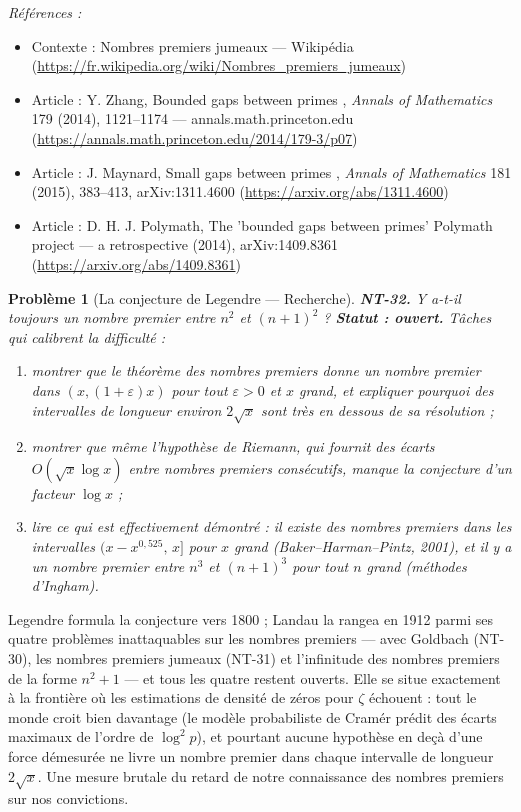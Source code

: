 \documentclass[11pt]{article}
\newtheorem{problem}{Problème}
\newenvironment{refs}{\par\small\noindent\emph{Références :}\begin{itemize}\setlength\itemsep{0pt}}{\end{itemize}\normalsize}
\begin{document}
\begin{refs}
\item Contexte : Nombres premiers jumeaux --- Wikipédia (\url{https://fr.wikipedia.org/wiki/Nombres_premiers_jumeaux})
\item Article : Y. Zhang, \og{} Bounded gaps between primes \fg{}, \textit{Annals of Mathematics} 179 (2014), 1121--1174 --- annals.math.princeton.edu (\url{https://annals.math.princeton.edu/2014/179-3/p07})
\item Article : J. Maynard, \og{} Small gaps between primes \fg{}, \textit{Annals of Mathematics} 181 (2015), 383--413, arXiv:1311.4600 (\url{https://arxiv.org/abs/1311.4600})
\item Article : D. H. J. Polymath, \og{} The 'bounded gaps between primes' Polymath project --- a retrospective \fg{} (2014), arXiv:1409.8361 (\url{https://arxiv.org/abs/1409.8361})
\end{refs}

\bigskip

\begin{problem}[{La conjecture de Legendre --- Recherche}]
\textbf{NT-32.} Y a-t-il toujours un nombre premier entre $n^2$ et
$(n + 1)^2$ ? \textbf{Statut : ouvert.} Tâches qui calibrent la difficulté :
\begin{enumerate}
\item[(i)] montrer que
le théorème des nombres premiers donne un nombre premier dans $(x, (1 + \varepsilon)x)$ pour tout
$\varepsilon > 0$ et $x$ grand, et expliquer pourquoi des intervalles de longueur environ
$2\sqrt{x}$ sont très en dessous de sa résolution ;
\item[(ii)] montrer que même l'hypothèse de
Riemann, qui fournit des écarts $O(\sqrt{x} \log x)$ entre nombres premiers consécutifs,
manque la conjecture d'un facteur $\log x$ ;
\item[(iii)] lire ce qui est effectivement démontré :
il existe des nombres premiers dans les intervalles $(x - x^{0{,}525},\, x]$ pour $x$ grand
(Baker--Harman--Pintz, 2001), et il y a un nombre premier entre $n^3$ et $(n + 1)^3$ pour
tout $n$ grand (méthodes d'Ingham).
\end{enumerate}

\end{problem}

\noindent Legendre formula la conjecture vers 1800 ; Landau la rangea en 1912
parmi ses quatre problèmes \og{} inattaquables \fg{} sur les nombres premiers --- avec Goldbach (NT-30), les
nombres premiers jumeaux (NT-31) et l'infinitude des nombres premiers de la forme $n^2 + 1$ --- et
tous les quatre restent ouverts. Elle se situe exactement à la frontière où les estimations de
densité de zéros pour $\zeta$ échouent : tout le monde croit bien davantage (le modèle probabiliste de
Cramér prédit des écarts maximaux de l'ordre de $\log^2 p$), et pourtant aucune hypothèse en deçà
d'une force démesurée ne livre un nombre premier dans chaque intervalle de longueur
$2\sqrt{x}$. Une mesure brutale du retard de notre connaissance des nombres premiers sur nos
convictions.
\end{document}
